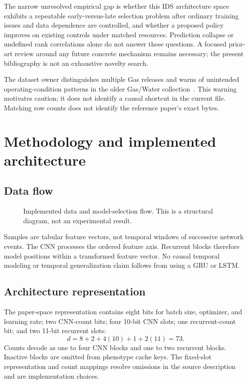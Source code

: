 \documentclass[11pt,a4paper]{report}
\begin{document}
The narrow unresolved empirical gap is whether this IDS architecture space exhibits a repeatable early-versus-late selection problem after ordinary training issues and data dependence are controlled, and whether a proposed policy improves on existing controls under matched resources. Prediction collapse or undefined rank correlations alone do not answer these questions. A focused prior-art review around any future concrete mechanism remains necessary; the present bibliography is not an exhaustive novelty search.

The dataset owner distinguishes multiple Gas releases and warns of unintended operating-condition patterns in the older Gas/Water collection~\cite{morrisdata}. This warning motivates caution; it does not identify a causal shortcut in the current file. Matching row counts does not identify the reference paper's exact bytes.

\chapter{Methodology and implemented architecture}
\section{Data flow}
\begin{figure}[htbp]\centering
\caption{Implemented data and model-selection flow. This is a structural diagram, not an experimental result.}\end{figure}
Samples are tabular feature vectors, not temporal windows of successive network events. The CNN processes the ordered feature axis. Recurrent blocks therefore model positions within a transformed feature vector. No causal temporal modeling or temporal generalization claim follows from using a GRU or LSTM.

\section{Architecture representation}
The paper-space representation contains eight bits for batch size, optimizer, and learning rate; two CNN-count bits; four 10-bit CNN slots; one recurrent-count bit; and two 11-bit recurrent slots:
\begin{equation}d=8+2+4(10)+1+2(11)=73.\end{equation}
Counts decode as one to four CNN blocks and one to two recurrent blocks. Inactive blocks are omitted from phenotype cache keys. The fixed-slot representation and count mappings resolve omissions in the source description and are implementation choices.
\end{document}
